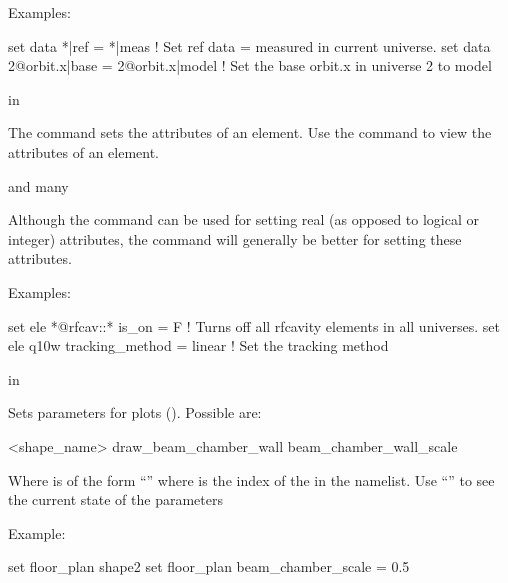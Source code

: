 {{\begin{description}
Examples:
\begin{example}
  set data *|ref = *|meas       ! Set ref data = measured in current universe.
  set data 2@orbit.x|base = 2@orbit.x|model 
                                ! Set the base orbit.x in universe 2 to model
\end{example}


 in

\item[set element <element_list> <attribute> = <value>] \Newline

\vskip -0.2in

The  command sets the attributes of an element. Use the
 command to view the attributes of an element. 

 and  many


Although the  command can be used for setting real (as
opposed to logical or integer) attributes, the 
command will generally be better for setting these attributes.

Examples:
\begin{example}
  set ele *@rfcav::* is_on = F  ! Turns off all rfcavity elements in all universes.
  set ele q10w tracking_method = linear ! Set the tracking method
\end{example}


 in

\item[set floor_plan <component> = <value>] \Newline

\vskip -0.2in

Sets parameters for  plots ().
Possible  are:
\begin{example}
  <shape_name>%
  draw_beam_chamber_wall
  beam_chamber_wall_scale
\end{example}
Where  is of the form ``'' where
 is the index of the  in the
 namelist.  Use ``''
to see the current state of the  parameters

Example:
\begin{example}
  set floor_plan shape2%
  set floor_plan beam_chamber_scale = 0.5
\end{example}


\end{description}}}
